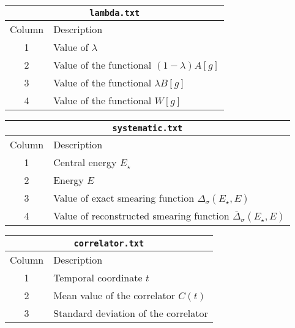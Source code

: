 \documentclass[12pt]{article}
\begin{document}
\begin{center}
\begin{tabular}{c|l}
\multicolumn{2}{c}{\texttt{lambda.txt}} \\
\hline
Column & Description\hspace{9cm} \\
\hline
1 & Value of $\lambda$ \\
2 & Value of the functional $(1-\lambda)A[g]$ \\
3 & Value of the functional $\lambda B[g]$ \\
4 & Value of the functional $W[g]$ \\
\end{tabular}
\end{center}
\vskip 3mm
\begin{center}
\begin{tabular}{c|l}
\multicolumn{2}{c}{\texttt{systematic.txt}} \\
\hline
Column & Description\hspace{9cm} \\
\hline
1 & Central energy $E_\star$ \\
2 & Energy $E$ \\
3 & Value of exact smearing function $\Delta_\sigma(E_\star,E)$ \\
4 & Value of reconstructed smearing function $\bar\Delta_\sigma(E_\star,E)$ \\
\end{tabular}
\end{center}
\vskip 3mm
\begin{center}
\begin{tabular}{c|l}
\multicolumn{2}{c}{\texttt{correlator.txt}} \\
\hline
Column & Description\hspace{9cm} \\
\hline
1 & Temporal coordinate $t$ \\
2 & Mean value of the correlator $C(t)$ \\
3 & Standard deviation of the correlator \\
\end{tabular}
\end{center}
\vskip 3mm
\end{document}

